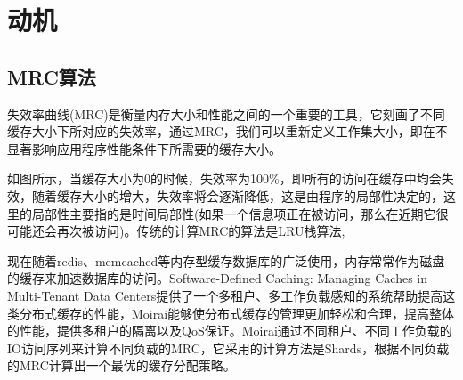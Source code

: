 
\chapter{动机}
\section{MRC算法}
失效率曲线(MRC)是衡量内存大小和性能之间的一个重要的工具，它刻画了不同缓存大小下所对应的失效率，通过MRC，我们可以重新定义工作集大小，即在不显著影响应用程序性能条件下所需要的缓存大小。

如图所示，当缓存大小为0的时候，失效率为100\%，即所有的访问在缓存中均会失效，随着缓存大小的增大，失效率将会逐渐降低，这是由程序的局部性决定的，这里的局部性主要指的是时间局部性(如果一个信息项正在被访问，那么在近期它很可能还会再次被访问)。传统的计算MRC的算法是LRU栈算法\supercite{Mattson1970Evaluation},


现在随着redis、memcached等内存型缓存数据库的广泛使用，内存常常作为磁盘的缓存来加速数据库的访问。Software-Defined Caching: Managing Caches in Multi-Tenant Data Centers提供了一个多租户、多工作负载感知的系统帮助提高这类分布式缓存的性能，Moirai能够使分布式缓存的管理更加轻松和合理，提高整体的性能，提供多租户的隔离以及QoS保证。Moirai通过不同租户、不同工作负载的IO访问序列来计算不同负载的MRC，它采用的计算方法是Shards，根据不同负载的MRC计算出一个最优的缓存分配策略。

